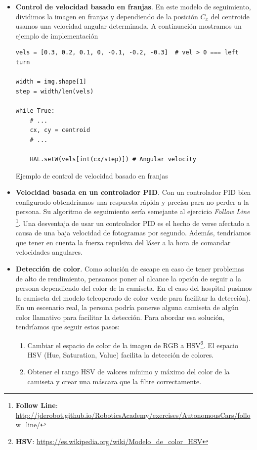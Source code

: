 \begin{itemize}
	\item \textbf{Control de velocidad basado en franjas}. En este modelo de seguimiento, dividimos la imagen en franjas y dependiendo de la posición $C_{x}$ del centroide usamos una velocidad angular determinada. A continuación mostramos un ejemplo de implementación
\begin{code}[H]
\begin{lstlisting}
vels = [0.3, 0.2, 0.1, 0, -0.1, -0.2, -0.3]	 # vel > 0 === left turn

width = img.shape[1]
step = width/len(vels)

while True:
	# ...
	cx, cy = centroid
	# ...
	
	HAL.setW(vels[int(cx/step)]) # Angular velocity
\end{lstlisting}
\caption{Ejemplo de control de velocidad basado en franjas}
\label{cod:vel_bar}
\end{code}
	\item \textbf{Velocidad basada en un controlador PID}. Con un controlador PID bien configurado obtendríamos una respuesta rápida y precisa para no perder a la persona. Su algoritmo de seguimiento sería semejante al ejercicio \textit{Follow Line} \footnote{\textbf{Follow Line}: \url{http://jderobot.github.io/RoboticsAcademy/exercises/AutonomousCars/follow_line/}}. Una desventaja de usar un controlador PID es el hecho de verse afectado a causa de una baja velocidad de fotogramas por segundo. Además, tendríamos que tener en cuenta la fuerza repulsiva del láser a la hora de comandar velocidades angulares.
	\item \textbf{Detección de color}. Como solución de escape en caso de tener problemas de alto de rendimiento, pensamos poner al alcance la opción de seguir a la persona dependiendo del color de la camiseta. En el caso del hospital pusimos la camiseta del modelo teleoperado de color verde para facilitar la detección). En un escenario real, la persona podría ponerse alguna camiseta de algún color llamativo para facilitar la detección. Para abordar esa solución, tendríamos que seguir estos pasos:
	\begin{enumerate}
		\item Cambiar el espacio de color de la imagen de RGB a HSV\footnote{\textbf{HSV}: \url{https://es.wikipedia.org/wiki/Modelo_de_color_HSV}}. El espacio HSV (Hue, Saturation, Value) facilita la detección de colores.
		\item Obtener el rango HSV de valores mínimo y máximo del color de la camiseta y crear una máscara que la filtre correctamente.

\end{enumerate}
\end{itemize}
